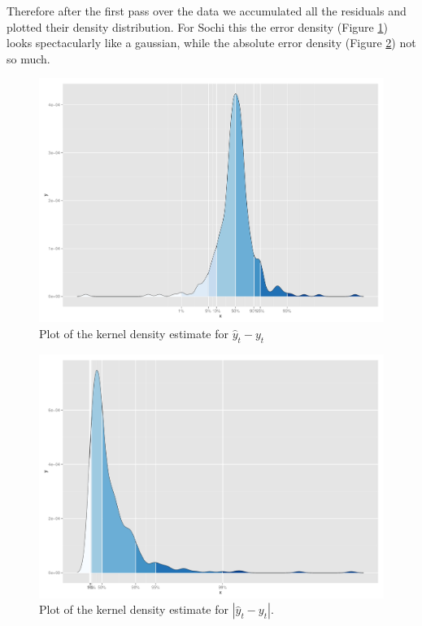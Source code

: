 \documentclass[minf,twoside,singlespacing,parskip,notimes,deptreport]{infthesis} %
\begin{document}
Therefore after the first pass over the data we accumulated all the residuals and plotted their density distribution. For Sochi this  the error density (Figure \ref{error-density}) looks spectacularly like a gaussian, while the absolute error density (Figure \ref{abs-error-density}) not so much. 

\begin{figure}[]
\begin{center}
\includegraphics[width=\textwidth]{percentiles}
\end{center}
\caption{Plot of the kernel density estimate for $\hat{y}_t  - y_t$}
\label{error-density}
\end{figure}
\begin{figure}[]
\begin{center}
\includegraphics[width=\textwidth]{error_plot}
\end{center}
\caption{Plot of the kernel density estimate for $|\hat{y}_t  - y_t|$.}
\label{abs-error-density}
\end{figure}
\end{document}
